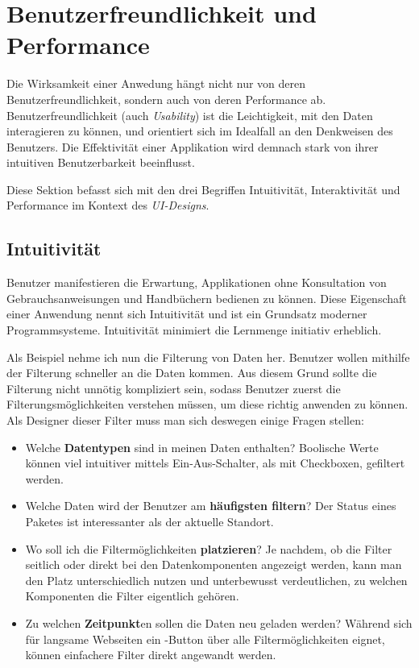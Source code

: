 \section{Benutzerfreundlichkeit und Performance}

Die Wirksamkeit einer Anwedung hängt nicht nur von deren Benutzerfreundlichkeit, sondern auch von deren Performance ab. Benutzerfreundlichkeit (auch \emph{Usability}) ist die Leichtigkeit, mit den Daten interagieren zu können, und orientiert sich im Idealfall an den Denkweisen des Benutzers. Die Effektivität einer Applikation wird demnach stark von ihrer intuitiven Benutzerbarkeit beeinflusst. \cite{richter1997usability,krug2018think}

Diese Sektion befasst sich mit den drei Begriffen Intuitivität, Interaktivität und Performance im Kontext des \emph{UI-Designs}.

\subsection{Intuitivität}

Benutzer manifestieren die Erwartung, Applikationen ohne Konsultation von Gebrauchsanweisungen und Handbüchern bedienen zu können. Diese Eigenschaft einer Anwendung nennt sich Intuitivität und ist ein Grundsatz moderner Programmsysteme. Intuitivität minimiert die Lernmenge initiativ erheblich. \cite{mardita2017intuitive}

Als Beispiel nehme ich nun die Filterung von Daten her. Benutzer wollen mithilfe der Filterung schneller an die Daten kommen. Aus diesem Grund sollte die Filterung nicht unnötig kompliziert sein, sodass Benutzer zuerst die Filterungsmöglichkeiten verstehen müssen, um diese richtig anwenden zu können. Als Designer dieser Filter muss man sich deswegen einige Fragen stellen: \cite{filter2023vassilatos}

\begin{itemize}
    \item Welche \textbf{Datentypen} sind in meinen Daten enthalten? Boolische Werte können viel intuitiver mittels Ein-Aus-Schalter, als mit Checkboxen, gefiltert werden. 
    \item Welche Daten wird der Benutzer am \textbf{häufigsten filtern}? Der Status eines Paketes ist interessanter als der aktuelle Standort.
    \item Wo soll ich die Filtermöglichkeiten \textbf{platzieren}? Je nachdem, ob die Filter seitlich oder direkt bei den Datenkomponenten angezeigt werden, kann man den Platz unterschiedlich nutzen und unterbewusst verdeutlichen, zu welchen Komponenten die Filter eigentlich gehören.
    \item Zu welchen \textbf{Zeitpunkt}en sollen die Daten neu geladen werden? Während sich für langsame Webseiten ein -Button über alle Filtermöglichkeiten eignet, können einfachere Filter direkt angewandt werden.
\end{itemize}

